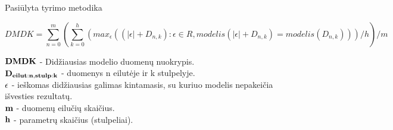 \begin{frame}[c]{Pasiūlyta tyrimo metodika}

\begin{equation}
    DMDK = {\sum_{n=0}^{m} ({\sum_{k=0}^{h} (max_{\epsilon}((|\epsilon| + D_{n, k}) : \epsilon \in R, modelis(|\epsilon| + D_{n, k}) = modelis(D_{n, k})))}/{h})}/{m}
\end{equation}

$\bf DMDK$ - Didžiausias modelio duomenų nuokrypis. \\
$\bf D_{eilut:n,stulp:k}$ - duomenys n eilutėje ir k stulpelyje. \\
$\bf \epsilon$ - ieškomas didžiausias galimas kintamasis, su kuriuo modelis nepakeičia išvesties rezultatų. \\
$\bf m$ - duomenų eilučių skaičius. \\
$\bf h$ - parametrų skaičius (stulpeliai).

\end{frame}
